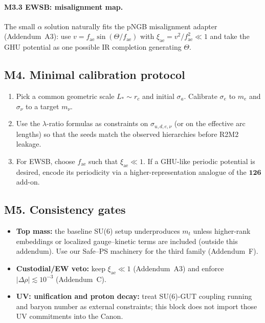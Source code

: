 \documentclass[11pt]{article}
\begin{document}
          \paragraph{M3.3 EWSB: misalignment map.}
              The small $\alpha$ solution naturally fits the pNGB misalignment adapter (Addendum~A3): use $v=f_{\text{ae}}\sin(\Theta/f_{\text{ae}})$ with $\xi_{\text{ae}}{=}v^2/f_{\text{ae}}^2\ll 1$ and take the GHU potential as one possible IR completion generating $\Theta$.

  \subsection*{M4. Minimal calibration protocol}
      \begin{enumerate}
      \item Pick a common geometric scale $L_*\sim r_c$ and initial $\sigma_a$. Calibrate $\sigma_e$ to $m_e$ and $\sigma_\nu$ to a target $m_\nu$.
      \item Use the $\lambda$-ratio formulas as constraints on $\sigma_{u,d,e,\nu}$ (or on the effective arc lengths) so that the seeds match the observed hierarchies before R2M2 leakage.
      \item For EWSB, choose $f_{\text{ae}}$ such that $\xi_{\text{ae}}\ll 1$. If a GHU-like periodic potential is desired, encode its periodicity via a higher-representation analogue of the $\mathbf{126}$ add-on.
      \end{enumerate}

  \subsection*{M5. Consistency gates}
      \begin{itemize}
      \item \textbf{Top mass:} the baseline SU(6) setup underproduces $m_t$ unless higher-rank embeddings or localized gauge–kinetic terms are included (outside this addendum). Use our Safe–PS machinery for the third family (Addendum~F).
      \item \textbf{Custodial/EW veto:} keep $\xi_{\text{ae}}\ll 1$ (Addendum~A3) and enforce $|\Delta\rho|\lesssim 10^{-3}$ (Addendum~C).
      \item \textbf{UV: unification and proton decay:} treat SU(6)-GUT coupling running and baryon number as external constraints; this block does not import those UV commitments into the Canon.
      \end{itemize}
\end{document}
